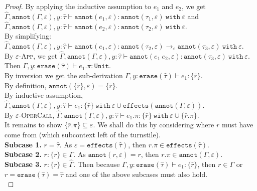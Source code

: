 \documentclass{llncs}
\newcommand{\keywadj}[1]{\mathtt{#1}}
\newcommand{\keyw}[1]{\keywadj{#1}~}
\newcommand{\kw}[1]{\keyw{ #1 }}
\newcommand{\kwa}[1]{\keywadj{ #1 }}
\newcommand{\Unit}[0]{ \kwa{Unit} }
\begin{document}
\begin{proof}
\noindent
By applying the inductive assumption to $e_1$ and $e_2$, we get $\hat \Gamma, \kwa{annot}(\Gamma, \varepsilon), y: \hat \tau \vdash \kwa{annot}(e_1, \varepsilon): \kwa{annot}(\tau_1, \varepsilon)~\kw{with} \varepsilon$ and $\hat \Gamma, \kwa{annot}(\Gamma, \varepsilon), y: \hat \tau \vdash \kwa{annot}(e_2, \varepsilon): \kwa{annot}(\tau_2, \varepsilon)~\kw{with} \varepsilon$. \\

\noindent
By simplifying: $\hat \Gamma, \kwa{annot}(\Gamma, \varepsilon), y: \hat \tau \vdash \kwa{annot}(e_1, \varepsilon): \kwa{annot}(\tau_2, \varepsilon) \rightarrow_{\varepsilon} \kwa{annot}(\tau_3, \varepsilon)~\kw{with} \varepsilon$. \\

\noindent
By \textsc{$\varepsilon$-App}, we get $\hat \Gamma, \kwa{annot}(\Gamma, \varepsilon), y: \hat \tau \vdash \kwa{annot}(e_1~e_2, \varepsilon):  \kwa{annot}(\tau_3, \varepsilon)~\kw{with} \varepsilon$.
\\

\noindent
{} Then $\Gamma, y: \kwa{erase}(\hat \tau) \vdash e_1.\pi : \Unit$. \\

\noindent
By inversion we get the sub-derivation $\Gamma, y: \kwa{erase}(\hat \tau) \vdash e_1: \{ \bar r \}$. \\

\noindent
By definition, $\kwa{annot}(\{ \bar r \}, \varepsilon) = \{ \bar r \}$. \\

\noindent
By inductive assumption, $\hat \Gamma, \kwa{annot}(\Gamma, \varepsilon), y: \hat \tau \vdash e_1: \{ \bar r \} ~\kw{with} \varepsilon \cup \kwa{effects}(\kwa{annot}(\Gamma, \varepsilon))$. \\

\noindent
By \textsc{$\varepsilon$-OperCall}, $\hat \Gamma, \kwa{annot}(\Gamma, \varepsilon), y: \hat \tau \vdash e_1.\pi: \{ \bar r \} ~\kw{with} \varepsilon \cup \{ \bar r.\pi \}$. \\

\noindent
It remains to show $\{ \bar r.\pi \} \subseteq \varepsilon$. We shall do this by considering where $r$ must have come from (which subcontext left of the turnstile). \\

\noindent
\textbf{Subcase 1.} $r = \hat \tau$. As $\varepsilon = \kwa{effects}(\hat \tau)$, then $r.\pi \in \kwa{effects}(\hat \tau)$. \\

\noindent
\textbf{Subcase 2.} $r: \{ r \} \in \Gamma$. As $\kwa{annot}(r, \varepsilon) = r$, then $r.\pi \in \kwa{annot}(\Gamma, \varepsilon)$. \\

\noindent
\textbf{Subcase 3.} $r: \{ r \} \in \hat \Gamma$. Then because $\Gamma, y: \kwa{erase}(\hat \tau) \vdash e_1: \{ \bar r \}$, then $r \in \Gamma$ or $r = \kwa{erase}(\hat \tau) = \hat \tau$ and one of the above subcases must also hold. \\


\end{proof}
\end{document}
